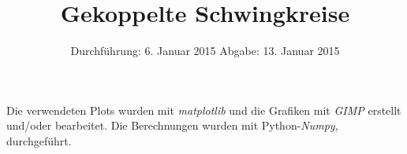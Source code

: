 
\usepackage{marvosym}
\subject{Anfängerpraktikum V355}
\title{Gekoppelte Schwingkreise
}
\date{
  Durchführung: 6. Januar 2015
  \hspace{1em}
  Abgabe: 13. Januar 2015
}


\maketitle
\thispagestyle{empty}
\newpage





\printbibliography
\noindent Die verwendeten Plots wurden mit \textit{matplotlib}\cite{matplotlib} und die Grafiken mit \textit{GIMP}\cite{gimp} erstellt und/oder bearbeitet.
Die Berechnungen wurden mit Python-\textit{Numpy}, \cite{numpy} durchgeführt.

